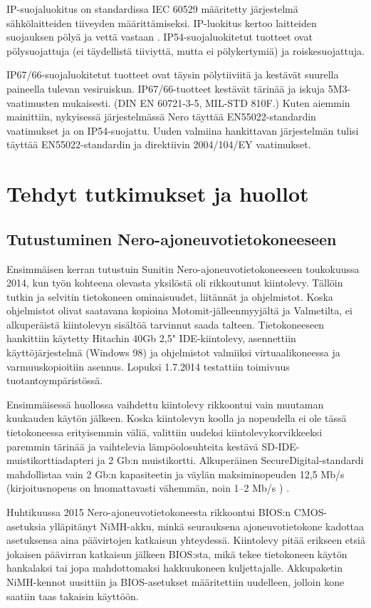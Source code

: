 IP-suojaluokitus on standardissa IEC 60529 määritetty järjestelmä sähkölaitteiden tiiveyden määrittämiseksi. IP-luokitus kertoo laitteiden suojauksen pölyä ja vettä vastaan \cite{IEC60529}. IP54-suojaluokitetut tuotteet ovat pölysuojattuja (ei täydellistä tiiviyttä, mutta ei pölykertymiä) ja roiskesuojattuja.

IP67/66-suojaluokitetut tuotteet ovat täysin pölytiiviitä ja kestävät suurella paineella tulevan vesiruiskun. IP67/66-tuotteet kestävät tärinää ja iskuja 5M3-vaatimusten mukaisesti. (DIN EN 60721-3-5, MIL-STD 810F.) Kuten aiemmin mainittiin, nykyisessä järjestelmässä Nero täyttää EN55022-standardin vaatimukset ja on IP54-suojattu. Uuden valmiina hankittavan järjestelmän tulisi täyttää EN55022-standardin ja direktiivin  2004/104/EY vaatimukset.

\newpage
\chapter{Tehdyt tutkimukset ja huollot}

\section{Tutustuminen Nero-ajoneuvotietokoneeseen}
Ensimmäisen kerran tutustuin Sunitin Nero-ajoneuvotietokoneeseen toukokuussa 2014, kun työn kohteena olevasta yksilöstä oli rikkoutunut kiintolevy. Tällöin tutkin ja selvitin tietokoneen ominaisuudet, liitännät ja ohjelmistot. Koska ohjelmistot olivat saatavana kopioina Motomit-jälleenmyyjältä ja Valmetilta, ei alkuperäistä kiintolevyn sisältöä tarvinnut saada talteen. Tietokoneeseen hankittiin käytetty Hitachin 40Gb 2,5" IDE-kiintolevy, asennettiin käyttöjärjestelmä (Windows 98) ja ohjelmistot valmiiksi virtuaalikoneessa ja varmuuskopioitiin asennus. Lopuksi 1.7.2014 testattiin toimivuus tuotantoympäristössä.

Ensimmäisessä huollossa vaihdettu kiintolevy rikkoontui vain muutaman kuukauden käytön jälkeen. Koska kiintolevyn koolla ja nopeudella ei ole tässä tietokoneessa erityisemmin väliä, valittiin uudeksi kiintolevykorvikkeeksi paremmin tärinää ja vaihtelevia lämpöolosuhteita kestävä SD-IDE-muistikorttiadapteri ja 2 Gb:n muistikortti. Alkuperäinen SecureDigital-standardi mahdollistaa vain 2 Gb:n kapasiteetin ja väylän maksiminopeuden 12,5 Mb/s (kirjoitusnopeus on huomattavasti vähemmän, noin 1--2 Mb/s ) \cite{sd:2gb}.

Huhtikuussa 2015 Nero-ajoneuvotietokoneesta rikkoontui BIOS:n CMOS-asetuksia ylläpitänyt NiMH-akku, minkä seurauksena ajoneuvotietokone kadottaa asetuksensa aina päävirtojen katkaisun yhteydessä. Kiintolevy pitää erikseen etsiä jokaisen päävirran katkaisun jälkeen BIOS:sta, mikä tekee tietokoneen käytön hankalaksi tai jopa mahdottomaksi hakkuukoneen kuljettajalle. Akkupaketin NiMH-kennot uusittiin ja BIOS-asetukset määritettiin uudelleen, jolloin kone saatiin taas takaisin käyttöön.

